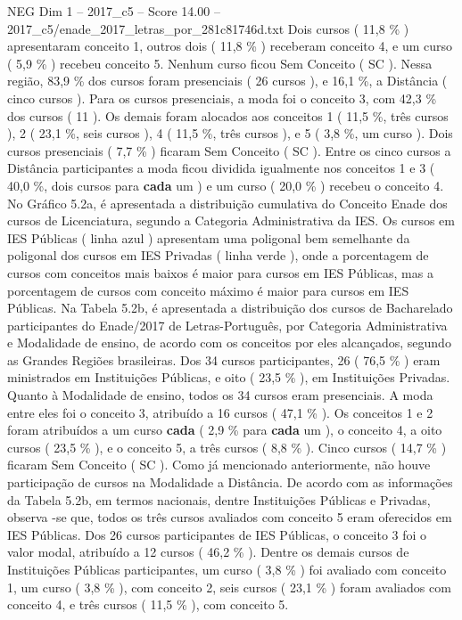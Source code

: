 \begin{textsample}{NEG Dim 1 – 2017\_c5 – Score 14.00 – 2017\_c5/enade\_2017\_letras\_por\_281c81746d.txt}
Dois cursos ( 11,8 \% ) apresentaram conceito 1, outros dois ( 11,8 \% ) receberam conceito 4, e um curso ( 5,9 \% ) recebeu conceito 5.
Nenhum curso ficou Sem Conceito ( SC ).
Nessa região, 83,9 \% dos cursos foram presenciais ( 26 cursos ), e 16,1 \%, a Distância ( cinco cursos ).
Para os cursos presenciais, a moda foi o conceito 3, com 42,3 \% dos cursos ( 11 ).
Os demais foram alocados aos conceitos 1 ( 11,5 \%, três cursos ), 2 ( 23,1 \%, seis cursos ), 4 ( 11,5 \%, três cursos ), e 5 ( 3,8 \%, um curso ).
Dois cursos presenciais ( 7,7 \% ) ficaram Sem Conceito ( SC ).
Entre os cinco cursos a Distância participantes a moda ficou dividida igualmente nos conceitos 1 e 3 ( 40,0 \%, dois cursos para \textbf{cada} um ) e um curso ( 20,0 \% ) recebeu o conceito 4.
No Gráfico 5.2a, é apresentada a distribuição cumulativa do Conceito Enade dos cursos de Licenciatura, segundo a Categoria Administrativa da IES.
Os cursos em IES Públicas ( linha azul ) apresentam uma poligonal bem semelhante da poligonal dos cursos em IES Privadas ( linha verde ), onde a porcentagem de cursos com conceitos mais baixos é maior para cursos em IES Públicas, mas a porcentagem de cursos com conceito máximo é maior para cursos em IES Públicas.
Na Tabela 5.2b, é apresentada a distribuição dos cursos de Bacharelado participantes do Enade/2017 de Letras-Português, por Categoria Administrativa e Modalidade de ensino, de acordo com os conceitos por eles alcançados, segundo as Grandes Regiões brasileiras.
Dos 34 cursos participantes, 26 ( 76,5 \% ) eram ministrados em Instituições Públicas, e oito ( 23,5 \% ), em Instituições Privadas.
Quanto à Modalidade de ensino, todos os 34 cursos eram presenciais.
A moda entre eles foi o conceito 3, atribuído a 16 cursos ( 47,1 \% ).
Os conceitos 1 e 2 foram atribuídos a um curso \textbf{cada} ( 2,9 \% para \textbf{cada} um ), o conceito 4, a oito cursos ( 23,5 \% ), e o conceito 5, a três cursos ( 8,8 \% ).
Cinco cursos ( 14,7 \% ) ficaram Sem Conceito ( SC ).
Como já mencionado anteriormente, não houve participação de cursos na Modalidade a Distância.
De acordo com as informações da Tabela 5.2b, em termos nacionais, dentre Instituições Públicas e Privadas, observa -se que, todos os três cursos avaliados com conceito 5 eram oferecidos em IES Públicas.
Dos 26 cursos participantes de IES Públicas, o conceito 3 foi o valor modal, atribuído a 12 cursos ( 46,2 \% ).
Dentre os demais cursos de Instituições Públicas participantes, um curso ( 3,8 \% ) foi avaliado com conceito 1, um curso ( 3,8 \% ), com conceito 2, seis cursos ( 23,1 \% ) foram avaliados com conceito 4, e três cursos ( 11,5 \% ), com conceito 5.

\end{textsample}
